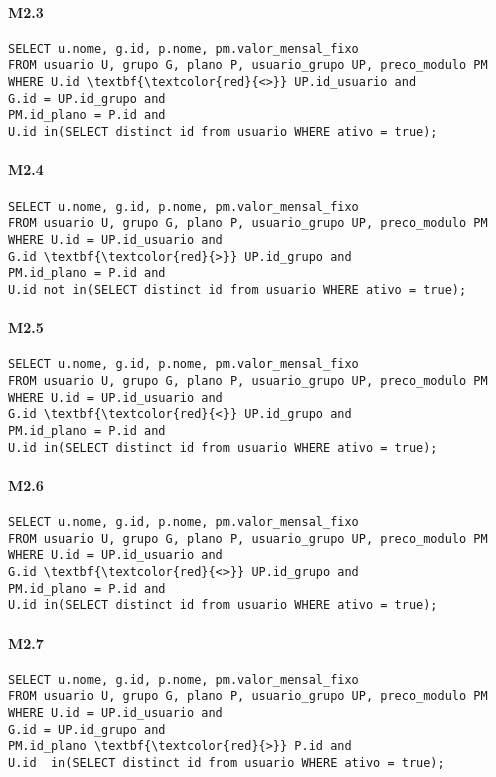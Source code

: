 \paragraph{M2.3}
\begin{Verbatim}
SELECT u.nome, g.id, p.nome, pm.valor_mensal_fixo
FROM usuario U, grupo G, plano P, usuario_grupo UP, preco_modulo PM
WHERE U.id \textbf{\textcolor{red}{<>}} UP.id_usuario and
G.id = UP.id_grupo and
PM.id_plano = P.id and
U.id in(SELECT distinct id from usuario WHERE ativo = true);
\end{Verbatim}


\paragraph{M2.4}
\begin{Verbatim}
SELECT u.nome, g.id, p.nome, pm.valor_mensal_fixo
FROM usuario U, grupo G, plano P, usuario_grupo UP, preco_modulo PM
WHERE U.id = UP.id_usuario and
G.id \textbf{\textcolor{red}{>}} UP.id_grupo and
PM.id_plano = P.id and
U.id not in(SELECT distinct id from usuario WHERE ativo = true);
\end{Verbatim}

\paragraph{M2.5}
\begin{Verbatim}
SELECT u.nome, g.id, p.nome, pm.valor_mensal_fixo
FROM usuario U, grupo G, plano P, usuario_grupo UP, preco_modulo PM
WHERE U.id = UP.id_usuario and
G.id \textbf{\textcolor{red}{<}} UP.id_grupo and
PM.id_plano = P.id and
U.id in(SELECT distinct id from usuario WHERE ativo = true);
\end{Verbatim}

\paragraph{M2.6}
\begin{Verbatim}
SELECT u.nome, g.id, p.nome, pm.valor_mensal_fixo
FROM usuario U, grupo G, plano P, usuario_grupo UP, preco_modulo PM
WHERE U.id = UP.id_usuario and
G.id \textbf{\textcolor{red}{<>}} UP.id_grupo and
PM.id_plano = P.id and
U.id in(SELECT distinct id from usuario WHERE ativo = true);
\end{Verbatim}

\paragraph{M2.7}
\begin{Verbatim}
SELECT u.nome, g.id, p.nome, pm.valor_mensal_fixo
FROM usuario U, grupo G, plano P, usuario_grupo UP, preco_modulo PM
WHERE U.id = UP.id_usuario and
G.id = UP.id_grupo and
PM.id_plano \textbf{\textcolor{red}{>}} P.id and
U.id  in(SELECT distinct id from usuario WHERE ativo = true);
\end{Verbatim}

